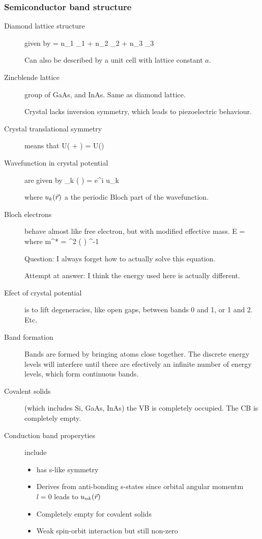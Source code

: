\subsubsection{Semiconductor band structure}
\begin{description}
\item[Diamond lattice structure] given by 
\beq
{} = n_1 _1  + n_2 _2 + n_3 _3
\eeq

Can also be described by a unit cell with lattice constant $a$. 

\item[Zincblende lattice] group of GaAs, and InAs. Same as diamond lattice. 

Crystal lacks inversion symmetry, which leads to piezoelectric behaviour. 

\item[Crystal translational symmetry] means that
\beq
U( + ) = U()
\eeq

\item[Wavefunction in crystal potential] are given by 
\beq
\psi_k ( ) = e^{i  \cdot {} } u_k
\eeq

where $u_k(\vec{r})$ a the periodic Bloch part of the wavefunction. 

\item[Bloch electrons] behave almost like free electron, but with modified effective mass. 
\beq
E = 
\eeq
where
\beq
m^* = \hbar^2 \left( \right) ^{-1}
\eeq


Question: I always forget how to actually solve this equation. 

Attempt at answer:  I think the energy used here is actually different. 

\item[Efect of crystal potential] is to lift degeneracies, like open gaps, between bands 0 and 1, or 1 and 2. Etc. 


\item[Band formation] Bands are formed by bringing atoms close together. The discrete energy levels will interfere until there are efectively an infinite number of energy levels, which form continuous bands.

\item[Covalent solids] (which includes Si, GaAs, InAs) the VB is completely occupied. 	The CB 	is completely empty. 

\item[Conduction band properyties] include
\begin{itemize}
\item has s-like symmetry
\item Derives from anti-bonding s-states since orbital angular momentm $l = 0$ leads to $u_{nk}(\vec{r})$ 
\item Completely empty for covalent solids
\item Weak spin-orbit interaction but still non-zero
\end{itemize}


\end{description}
